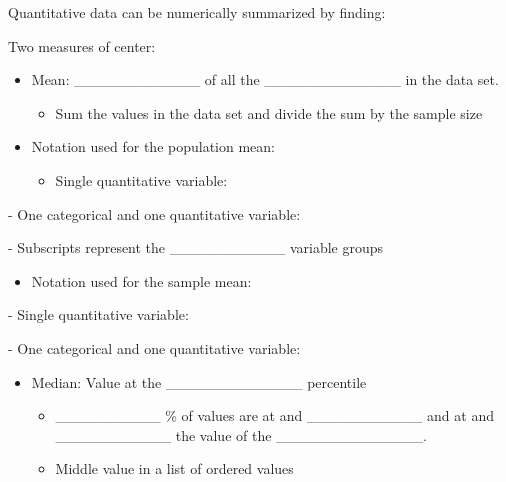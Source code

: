 \documentclass[
]{report}
\providecommand{\tightlist}{%
  \setlength{\itemsep}{0pt}\setlength{\parskip}{0pt}}
\newcommand{\rgi}{\hspace{24pt}}  %
\begin{document}

Quantitative data can be numerically summarized by finding:

Two measures of center:

\begin{itemize}
\item
  Mean: \_\_\_\_\_\_\_\_\_\_\_\_ of all the \_\_\_\_\_\_\_\_\_\_\_\_\_ in the data set.

  \begin{itemize}
  \tightlist
  \item
    Sum the values in the data set and divide
    the sum by the sample size
  \end{itemize}
\item
  Notation used for the population mean:

  \begin{itemize}
  \tightlist
  \item
    Single quantitative variable:
  \end{itemize}
\end{itemize}

\vspace{0.1in}

\rgi \rgi - One categorical and one quantitative variable:

\vspace{0.1in}

\rgi \rgi \rgi - Subscripts represent the \_\_\_\_\_\_\_\_\_\_\_ variable groups

\begin{itemize}
\tightlist
\item
  Notation used for the sample mean:
\end{itemize}

\rgi \rgi - Single quantitative variable:

\vspace{0.1in}

\rgi \rgi - One categorical and one quantitative variable:

\vspace{0.1in}

\begin{itemize}
\item
  Median: Value at the \_\_\_\_\_\_\_\_\_\_\_\_\_ percentile

  \begin{itemize}
  \item
    \_\_\_\_\_\_\_\_\_\_ \% of values are at and \_\_\_\_\_\_\_\_\_\_\_ and at and \_\_\_\_\_\_\_\_\_\_\_ the value of the \_\_\_\_\_\_\_\_\_\_\_\_\_\_.
  \item
    Middle value in a list of ordered values
  \end{itemize}
\end{itemize}
\end{document}
